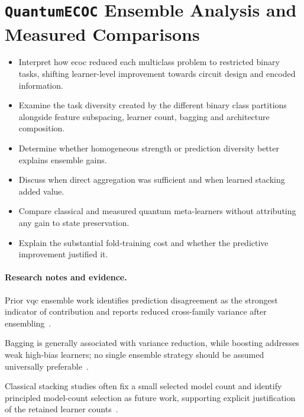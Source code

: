 \documentclass[]{UCD_CS_MSc_AAI_Report}
\newcommand{\limitation}[1]{{\color{orange}#1}}
\newcommand{\result}[1]{{\color{green!60!black}#1}}
\newcommand{\comparison}[1]{{\color{pink!70!violet}#1}}
\newcommand{\researchnotes}{\paragraph{Research notes and evidence.}}
\begin{document}
\section{\texttt{QuantumECOC} Ensemble Analysis and Measured Comparisons}
\label{sec:discussion-ensembles}
\begin{itemize}
    \item Interpret how \ac{ecoc} reduced each multiclass problem to restricted binary tasks, shifting learner-level improvement towards circuit design and encoded information.
    \item Examine the task diversity created by the different binary class partitions alongside feature subspacing, learner count, bagging and architecture composition.
    \item Determine whether homogeneous strength or prediction diversity better explains ensemble gains.
    \item Discuss when direct aggregation was sufficient and when learned stacking added value.
    \item Compare classical and measured quantum meta-learners without attributing any gain to state preservation.
    \item Explain the substantial fold-training cost and whether the predictive improvement justified it.
\end{itemize}

\researchnotes
\begin{itemize}
    \result{\item Prior \ac{vqc} ensemble work identifies prediction disagreement as the strongest indicator of contribution and reports reduced cross-family variance after ensembling~\cite{pinto_composing_2026}.}
    \comparison{\item Bagging is generally associated with variance reduction, while boosting addresses weak high-bias learners; no single ensemble strategy should be assumed universally preferable~\cite{incudini_resource_2023}.}
    \limitation{\item Classical stacking studies often fix a small selected model count and identify principled model-count selection as future work, supporting explicit justification of the retained learner counts~\cite{demir_modified_2018}.}
\end{itemize}
\end{document}
